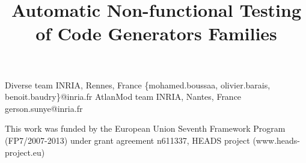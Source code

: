 \documentclass[preprint,10pt]{sigplanconf}
\begin{document}
 

\title{Automatic Non-functional Testing of Code Generators Families}
 

           {Diverse team INRIA, Rennes, France}
           { \{mohamed.boussaa, olivier.barais, benoit.baudry\}@inria.fr}
           {AtlanMod team INRIA, Nantes, France}
           {gerson.sunye@inria.fr}



\maketitle

\newcommand{\etal}{et al.}
\newcommand{\eg}[0]{e.\,g.}
\newcommand{\ie}[0]{i.\,e.}



\vfill



%






 

 
 

\acks

This work was funded by the European Union Seventh Framework Program (FP7/2007-2013) under grant agreement n611337, HEADS project (www.heads-project.eu)






 

 
\end{document}
